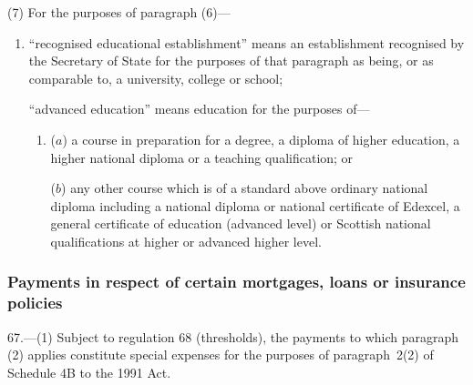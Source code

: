 \documentclass[12pt,a4paper]{article}
\begin{document}
(7) For the purposes of paragraph (6)—
\begin{enumerate}\item[]
“recognised educational establishment” means an establishment recognised by the Secretary of State for the purposes of that paragraph as being, or as comparable to, a university, college or school;

“advanced education” means education for the purposes of—
\begin{enumerate}\item[]
($a$) 
a course in preparation for a degree, a diploma of higher education, a higher national diploma or a teaching qualification; or

($b$) 
any other course which is of a standard above ordinary national diploma including a national diploma or national certificate of Edexcel, a general certificate of education (advanced level) or Scottish national qualifications at higher or advanced higher level.
\end{enumerate}
\end{enumerate}

\subsubsection[67. Payments in respect of certain mortgages, loans or insurance policies]{Payments in respect of certain mortgages, loans or insurance policies}

67.---(1)  Subject to regulation 68 (thresholds), the payments to which paragraph (2) applies constitute special expenses for the purposes of paragraph~2(2) of Schedule 4B to the 1991 Act.
\end{document}
